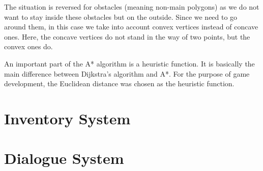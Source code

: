 The situation is reversed for obstacles (meaning non-main polygons) as we do not want to stay inside these obstacles but on the outside. Since we need to go around them, in this case we take into account convex vertices instead of concave ones. Here, the concave vertices do not stand in the way of two points, but the convex ones do. 

An important part of the A* algorithm is a heuristic function. It is basically the main difference between Dijkstra’s algorithm and A*. For the purpose of game development, the Euclidean distance was chosen as the heuristic function.

\section{Inventory System}


\section{Dialogue System}


